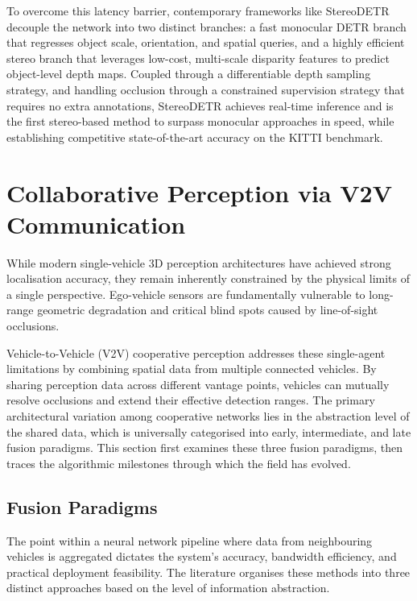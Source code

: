 To overcome this latency barrier, contemporary frameworks like
StereoDETR~\cite{mu2025} decouple the network into two distinct branches: a fast
monocular DETR branch that regresses object scale, orientation, and spatial
queries, and a highly efficient stereo branch that leverages low-cost,
multi-scale disparity features to predict object-level depth maps. Coupled through
a differentiable depth sampling strategy, and handling occlusion through a
constrained supervision strategy that requires no extra annotations, StereoDETR
achieves real-time inference and is the first stereo-based method to surpass
monocular approaches in speed, while establishing competitive state-of-the-art
accuracy on the KITTI benchmark.

\section{Collaborative Perception via V2V Communication}
\label{sec:collab}

While modern single-vehicle 3D perception architectures have achieved strong
localisation accuracy, they remain inherently constrained by the physical limits
of a single perspective. Ego-vehicle sensors are fundamentally vulnerable to
long-range geometric degradation and critical blind spots caused by line-of-sight
occlusions.

Vehicle-to-Vehicle (V2V) cooperative perception addresses these single-agent
limitations by combining spatial data from multiple connected vehicles. By
sharing perception data across different vantage points, vehicles can mutually
resolve occlusions and extend their effective detection ranges. The primary
architectural variation among cooperative networks lies in the abstraction level
of the shared data, which is universally categorised into early, intermediate,
and late fusion paradigms. This section first examines these three fusion
paradigms, then traces the algorithmic milestones through which the field has
evolved.

\subsection{Fusion Paradigms}

The point within a neural network pipeline where data from neighbouring vehicles
is aggregated dictates the system's accuracy, bandwidth efficiency, and practical
deployment feasibility. The literature organises these methods into three distinct
approaches based on the level of information abstraction.

